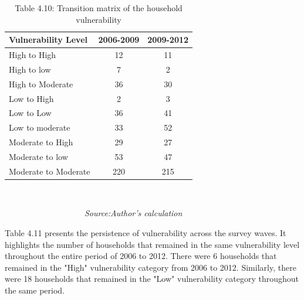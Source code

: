 \documentclass[12pt, a4paper]{article}
\begin{document}
	\begin{table}[H]
	\captionsetup{labelformat=empty}
	\captionsetup{labelformat=empty, skip=-7pt} %
	\caption{{Table 4.10}: Transition matrix of the household vulnerability}
	\label{tab:Vulnerabilitytransitions}	\begin{center}
	\begin{tabular}{lcc} \hline
		\textbf{Vulnerability Level} & \textbf{2006-2009} & \textbf{2009-2012} \\ \hline
		High to High                 & 12                 & 11                 \\
		High to low                  & 7                  & 2                  \\
		High to Moderate             & 36                 & 30                 \\
		Low to High                  & 2                  & 3                  \\
		Low to Low                   & 36                 & 41                 \\
		Low to moderate              & 33                 & 52                 \\
		Moderate to High             & 29                 & 27                 \\
		Moderate to low              & 53                 & 47                 \\
		Moderate to Moderate         & 220                & 215       \\ \hline \hline        
	\end{tabular} \\
	\end{center}\vspace{-8pt}
	\textit{\ \ \ \ \ \ \ \ \ \ \ \ \ \ \ \ \ \ \ Source:Author's calculation}
\end{table}

Table 4.11 presents the persistence of vulnerability across the survey waves. It highlights the number of households that remained in the same vulnerability level throughout the entire period of 2006 to 2012. There were 6 households that remained in the "High" vulnerability category from 2006 to 2012. Similarly, there were 18 households that remained in the "Low" vulnerability category throughout the same period.
\end{document}
